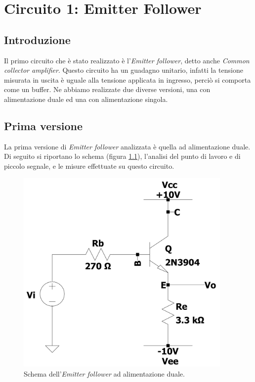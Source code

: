 \documentclass{report}
\begin{document}
\chapter{Circuito 1: Emitter Follower}
\section{Introduzione} \label{introEFv1}
Il primo circuito che è stato realizzato è l'\textit{Emitter follower}, detto anche \textit{Common collector amplifier}. Questo circuito ha un guadagno unitario, infatti la tensione misurata in uscita è uguale alla tensione applicata in ingresso, perciò si comporta come un buffer. Ne abbiamo realizzate due diverse versioni, una con alimentazione duale ed una con alimentazione singola. 
\section{Prima versione} %
La prima versione di \textit{Emitter follower} analizzata è quella ad alimentazione duale. Di seguito si riportano lo schema (figura \ref{figura:EFv1}), l'analisi del punto di lavoro e di piccolo segnale, e le misure effettuate su questo circuito. 
\begin{figure}[h]
\centering
\includegraphics[height=10.1cm]{immagini/EFv1}
\caption{Schema dell'\textit{Emitter follower} ad alimentazione duale.}
\label{figura:EFv1}
\end{figure}
\end{document}
